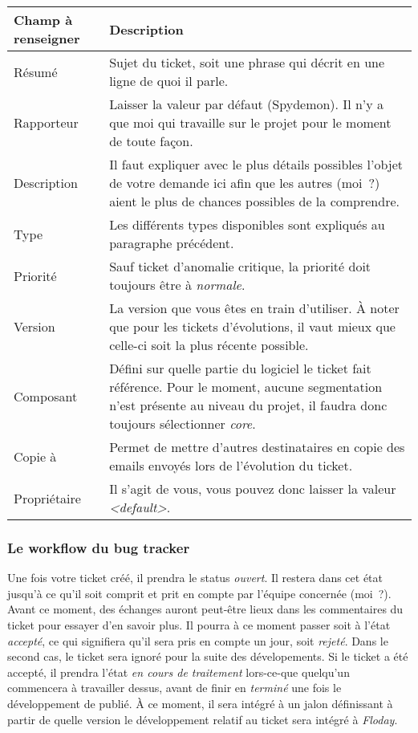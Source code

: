 \begin{longtable}{|p{3cm}|p{10cm}|}
	\hline
	Champ à renseigner & Description\\
	\hline
	Résumé & Sujet du ticket, soit une phrase qui décrit en une ligne de quoi il parle.\\
	Rapporteur & Laisser la valeur par défaut (Spydemon). Il n'y a que moi qui travaille sur le projet pour le moment de toute façon.\\
	Description & Il faut expliquer avec le plus détails possibles l'objet de votre demande ici afin que les autres (moi~?) aient le plus de chances possibles de la comprendre.\\
	Type & Les différents types disponibles sont expliqués au paragraphe précédent.\\
	Priorité & Sauf ticket d'anomalie critique, la priorité doit toujours être à \emph{normale}.\\
	Version & La version que vous êtes en train d'utiliser. À noter que pour les tickets d'évolutions, il vaut mieux que celle-ci soit la plus récente possible.\\
	Composant & Défini sur quelle partie du logiciel le ticket fait référence. Pour le moment, aucune segmentation n'est présente au niveau du projet, il faudra donc toujours sélectionner \emph{core}.\\
	Copie à & Permet de mettre d'autres destinataires en copie des emails envoyés lors de l'évolution du ticket.\\
	Propriétaire & Il s'agit de vous, vous pouvez donc laisser la valeur \emph{<default>}.\\
	\hline
\end{longtable}

\subsubsection{Le workflow du bug tracker}

Une fois votre ticket créé, il prendra le status \emph{ouvert}.
Il restera dans cet état jusqu'à ce qu'il soit comprit et prit en compte par l'équipe concernée (moi~?).
Avant ce moment, des échanges auront peut-être lieux dans les commentaires du ticket pour essayer d'en savoir plus.
Il pourra à ce moment passer soit à l'état \emph{accepté}, ce qui signifiera qu'il sera pris en compte un jour, soit \emph{rejeté}.
Dans le second cas, le ticket sera ignoré pour la suite des dévelopements.
Si le ticket a été accepté, il prendra l'état \emph{en cours de traitement} lors-ce-que quelqu'un commencera à travailler dessus, avant de finir en \emph{terminé} une fois le développement de publié.
À ce moment, il sera intégré à un jalon définissant à partir de quelle version le développement relatif au ticket sera intégré à \emph{Floday}.
